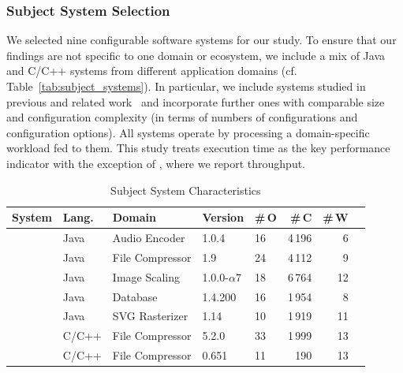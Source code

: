 {\subsubsection{Subject System Selection}
{\color{black}
We selected nine configurable software systems for our study. To ensure that our findings are not specific to one domain or ecosystem, we include a mix of Java and C/C++ systems from different application domains (cf. Table~\ref{tab:subject_systems}). In particular, we include systems studied in previous and related work~\cite{velez_2020_configcrusher_jase,weber_white_2021,alves_sampling_2020} and incorporate further ones with comparable size and configuration complexity (in terms of numbers of configurations and configuration options). All systems operate by processing a domain-specific workload fed to them. This study treats execution time as the key performance indicator with the exception of \htwo, where we report throughput.

\begin{table}
	\footnotesize
	\centering
	\caption{Subject System Characteristics}
	

\begin{tabular}{p{1.1cm}p{0.6cm}p{1.9cm}p{0.99cm}p{0.2cm}rrr}
	\toprule
	\textbf{System} & \textbf{Lang.} & \textbf{Domain} & \textbf{Version} & \textbf{\#\,O} & \textbf{\#\,C} & \textbf{\#\,W}  \\
	
	
	\midrule
	\jumper & Java & Audio Encoder & 1.0.4 & 16 & 4\,196 & 6   \\
	
	\kanzi &Java  & File Compressor & 1.9 & 24 & 4\,112 & 9 \\
	
	\dconvert & Java & Image Scaling & 1.0.0-$\alpha$7 & 18 & 6\,764 & 12  \\
	
	\htwo & Java & Database & 1.4.200 & 16 & 1\,954  & 8  \\
	
	\batik & Java & SVG Rasterizer & 1.14 & 10 & 1\,919 &  11  \\

	\midrule
	
	\xz & C/C++ & File Compressor & 5.2.0 & 33 & 1\,999 & 13  \\
	\lrzip & C/C++ & File Compressor & 0.651 & 11 & 190 & 13  \\
	

\end{tabular}
\end{table}}}
